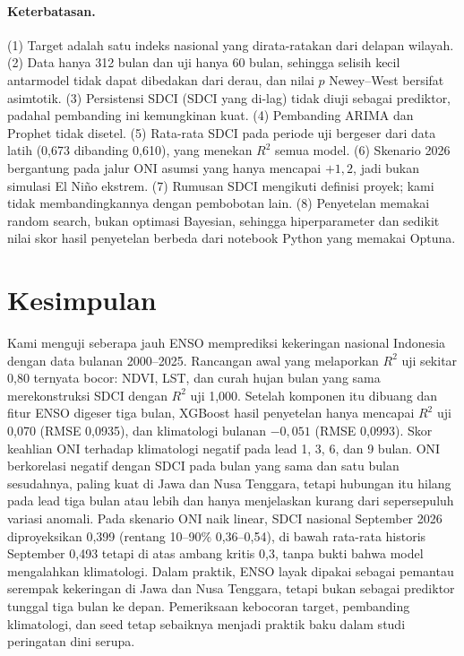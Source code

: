 \documentclass[11pt,twoside]{article}
\begin{document}
\paragraph{Keterbatasan.} (1) Target adalah satu indeks nasional yang dirata-ratakan dari delapan wilayah. (2) Data hanya 312 bulan dan uji hanya 60 bulan, sehingga selisih kecil antarmodel tidak dapat dibedakan dari derau, dan nilai $p$ Newey--West bersifat asimtotik. (3) Persistensi SDCI (SDCI yang di-lag) tidak diuji sebagai prediktor, padahal pembanding ini kemungkinan kuat. (4) Pembanding ARIMA dan Prophet tidak disetel. (5) Rata-rata SDCI pada periode uji bergeser dari data latih (0,673 dibanding 0,610), yang menekan $R^2$ semua model. (6) Skenario 2026 bergantung pada jalur ONI asumsi yang hanya mencapai $+1{,}2$, jadi bukan simulasi El Ni\~no ekstrem. (7) Rumusan SDCI mengikuti definisi proyek; kami tidak membandingkannya dengan pembobotan lain. (8) Penyetelan memakai random search, bukan optimasi Bayesian, sehingga hiperparameter dan sedikit nilai skor hasil penyetelan berbeda dari notebook Python yang memakai Optuna.

\section{Kesimpulan}
\label{Sec:Conclusion}

Kami menguji seberapa jauh ENSO memprediksi kekeringan nasional Indonesia dengan data bulanan 2000--2025. Rancangan awal yang melaporkan $R^2$ uji sekitar 0,80 ternyata bocor: NDVI, LST, dan curah hujan bulan yang sama merekonstruksi SDCI dengan $R^2$ uji 1,000. Setelah komponen itu dibuang dan fitur ENSO digeser tiga bulan, XGBoost hasil penyetelan hanya mencapai $R^2$ uji 0,070 (RMSE 0,0935), dan klimatologi bulanan $-0{,}051$ (RMSE 0,0993). Skor keahlian ONI terhadap klimatologi negatif pada lead 1, 3, 6, dan 9 bulan. ONI berkorelasi negatif dengan SDCI pada bulan yang sama dan satu bulan sesudahnya, paling kuat di Jawa dan Nusa Tenggara, tetapi hubungan itu hilang pada lead tiga bulan atau lebih dan hanya menjelaskan kurang dari sepersepuluh variasi anomali. Pada skenario ONI naik linear, SDCI nasional September 2026 diproyeksikan 0,399 (rentang 10--90\% 0,36--0,54), di bawah rata-rata historis September 0,493 tetapi di atas ambang kritis 0,3, tanpa bukti bahwa model mengalahkan klimatologi. Dalam praktik, ENSO layak dipakai sebagai pemantau serempak kekeringan di Jawa dan Nusa Tenggara, tetapi bukan sebagai prediktor tunggal tiga bulan ke depan. Pemeriksaan kebocoran target, pembanding klimatologi, dan seed tetap sebaiknya menjadi praktik baku dalam studi peringatan dini serupa.
\end{document}
